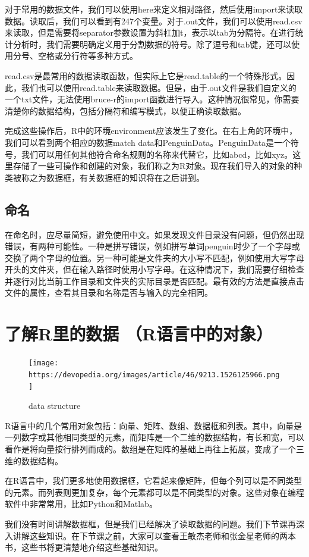 \documentclass[
  oneside]{book}
\begin{document}
对于常用的数据文件，我们可以使用here来定义相对路径，然后使用import来读取数据。读取后，我们可以看到有247个变量。对于.out文件，我们可以使用read.csv来读取，但是需要将separator参数设置为斜杠加t，表示以tab为分隔符。在进行统计分析时，我们需要明确定义用于分割数据的符号。除了逗号和tab键，还可以使用分号、空格或分行符等多种方式。

read.csv是最常用的数据读取函数，但实际上它是read.table的一个特殊形式。因此，我们也可以使用read.table来读取数据。但是，由于.out文件是我们自定义的一个txt文件，无法使用bruce-r的import函数进行导入。这种情况很常见，你需要清楚你的数据结构，包括分隔符和编写模式，以便正确读取数据。

完成这些操作后，R中的环境environment应该发生了变化。在右上角的环境中，我们可以看到两个相应的数据match data和PenguinData。PenguinData是一个符号，我们可以用任何其他符合命名规则的名称来代替它，比如abcd，比如xyz。这里存储了一些可操作和创建的对象，我们称之为R对象。现在我们导入的对象的种类被称之为数据框，有关数据框的知识将在之后讲到。

\hypertarget{ux547dux540d}{%
\subsection{命名}\label{ux547dux540d}}

在命名时，应尽量简短，避免使用中文。如果发现文件目录没有问题，但仍然出现错误，有两种可能性。一种是拼写错误，例如拼写单词penguin时少了一个字母或交换了两个字母的位置。另一种可能是文件夹的大小写不匹配，例如使用大写字母开头的文件夹，但在输入路径时使用小写字母。在这种情况下，我们需要仔细检查并逐行对比当前工作目录和文件夹的实际目录是否匹配。最有效的方法是直接点击文件的属性，查看其目录和名称是否与输入的完全相同。

\hypertarget{3-data-object}{%
\section{了解R里的数据 （R语言中的对象）}\label{3-data-object}}

\begin{figure}
\centering
\texttt{[image: https://devopedia.org/images/article/46/9213.1526125966.png]}
\caption{data structure}
\end{figure}

R语言中的几个常用对象包括：向量、矩阵、数组、数据框和列表。其中，向量是一列数字或其他相同类型的元素，而矩阵是一个二维的数据结构，有长和宽，可以看作是将向量按行排列而成的。数组是在矩阵的基础上再往上拓展，变成了一个三维的数据结构。

在R语言中，我们更多地使用数据框，它看起来像矩阵，但每个列可以是不同类型的元素。而列表则更加复杂，每个元素都可以是不同类型的对象。这些对象在编程软件中非常常用，比如Python和Matlab。

我们没有时间讲解数据框，但是我们已经解决了读取数据的问题。我们下节课再深入讲解这些知识。在下节课之前，大家可以查看王敏杰老师和张金星老师的两本书，这些书将更清楚地介绍这些基础知识。

\printbibliography
\end{document}

